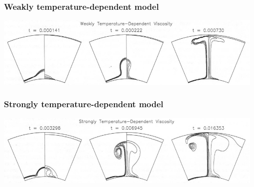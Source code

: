 \subsubsection*{Weakly temperature-dependent model}
\begin{center}
\includegraphics[width=15cm]{python_codes/fieldstone_106/images/keki97c}
\end{center}

\subsubsection*{Strongly temperature-dependent model}
\begin{center}
\includegraphics[width=15cm]{python_codes/fieldstone_106/images/keki97d}
\end{center}



